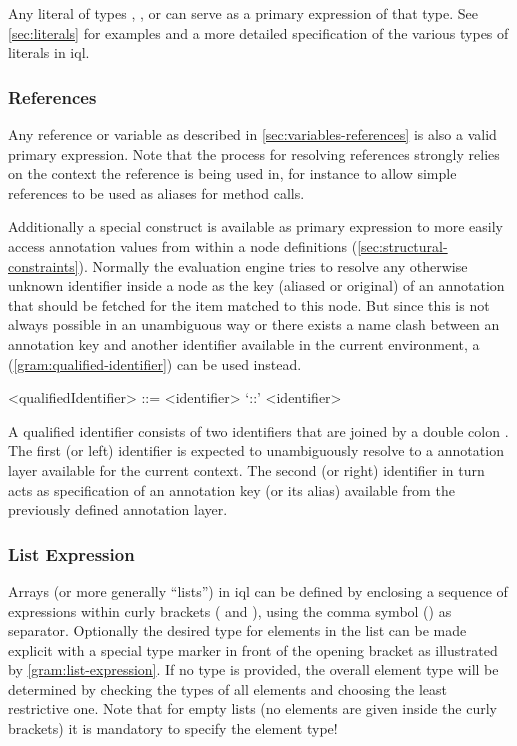 \documentclass[11pt,a4paper]{report}
\begin{document}
Any literal of types , ,  or  can serve as a primary expression of that type.
See \cref{sec:literals} for examples and a more detailed specification of the various types of literals in \ac{iql}.

\subsubsection{References}
\label{sec:references}
Any reference or variable as described in \cref{sec:variables-references} is also a valid primary expression.
Note that the process for resolving references strongly relies on the context the reference is being used in, for instance to allow simple references to be used as aliases for method calls.

Additionally a special construct is available as primary expression to more easily access annotation values from within a node definitions (\ref{sec:structural-constraints}).
Normally the evaluation engine tries to resolve any otherwise unknown identifier inside a node as the key (aliased or original) of an annotation that should be fetched for the item matched to this node.
But since this is not always possible in an unambiguous way or there exists a name clash between an annotation key and another identifier available in the current environment, a  (\cref{gram:qualified-identifier}) can be used instead.

\begin{gram}
	\label{gram:qualified-identifier}
	\begin{grammar}	
		<qualifiedIdentifier> ::= <identifier> `::' <identifier> 	
	\end{grammar}
\end{gram}

A qualified identifier consists of two identifiers that are joined by a double colon \lit{::}.
The first (or left) identifier is expected to unambiguously resolve to a annotation layer available for the current context.
The second (or right) identifier in turn acts as specification of an annotation key (or its alias) available from the previously defined annotation layer.

\subsubsection{List Expression}
\label{sec:list-expression}
Arrays (or more generally ``lists'') in \ac{iql} can be defined by enclosing a sequence of expressions within curly brackets (\lit{\{} and \lit{\}}), using the comma symbol (\lit{,}) as separator.
Optionally the desired type for elements in the list can be made explicit with a special type marker in front of the opening bracket as illustrated by \cref{gram:list-expression}.
If no type is provided, the overall element type will be determined by checking the types of all elements and choosing the least restrictive one.
Note that for empty lists (no elements are given inside the curly brackets) it is mandatory to specify the element type!
\end{document}
